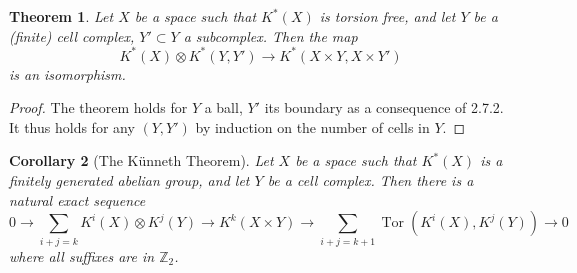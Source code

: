 \documentclass[leqno]{book}
\numberwithin{equation}{section}
\newtheorem{theorem}{Theorem}[section]%
\newtheorem{corollary}[theorem]{Corollary}
\theoremstyle{definition}
\begin{document}
            \begin{theorem}
              Let $X$ be a space such that $K^{*}(X)$ is torsion free, and let $Y$ be a (finite) cell complex, $Y'\subset Y$ a subcomplex. Then the map
              \begin{equation*}
                K^{*}(X)\otimes K^{*}(Y,Y')\to K^{*}(X\times Y, X\times Y')
              \end{equation*}
              is an isomorphism.
            \end{theorem}

            \begin{proof}
              The theorem holds for $Y$ a ball, $Y'$ its boundary as a consequence of 2.7.2. It thus holds for any $(Y,Y')$ by induction on the number of cells in $Y$.
            \end{proof}

            \begin{corollary}[The Künneth Theorem]
              Let $X$ be a space such that $K^{*}(X)$ is a finitely generated abelian group, and let $Y$ be a cell complex. Then there is a natural exact sequence
              \begin{equation*}
                0\to \sum_{i+j=k} K^{i}(X)\otimes K^{j}(Y)\to K^{k}(X\times Y)\to \sum_{i+j=k+1} \operatorname{Tor}(K^{i}(X),K^{j}(Y))\to 0
              \end{equation*}
              where all suffixes are in $\mathbb{Z}_{2}$.
            \end{corollary}
\end{document}
